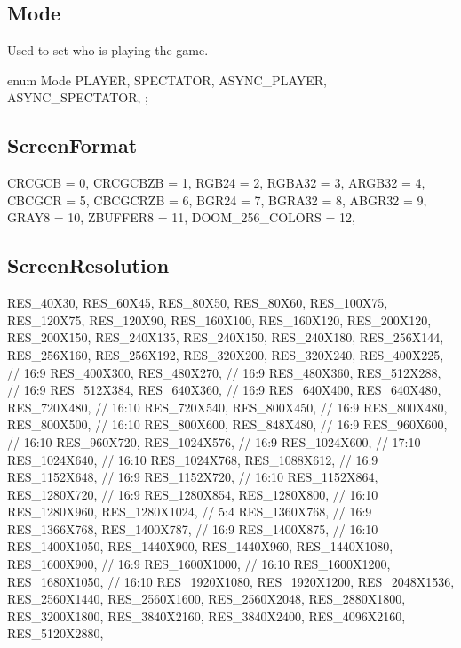 \subsection{Mode}
Used to set who is playing the game.
\begin{clinee}
    enum Mode {
        PLAYER,
        SPECTATOR,
        ASYNC_PLAYER,
        ASYNC_SPECTATOR,
    };
\end{clinee}
\subsection{ScreenFormat}
\begin{clinee}
CRCGCB = 0,
        CRCGCBZB = 1,
        RGB24 = 2,
        RGBA32 = 3,
        ARGB32 = 4,
        CBCGCR = 5,
        CBCGCRZB = 6,
        BGR24 = 7,
        BGRA32 = 8,
        ABGR32 = 9,
        GRAY8 = 10,
        ZBUFFER8 = 11,
        DOOM_256_COLORS = 12,
\end{clinee}
\subsection{ScreenResolution}
\begin{clinee}
RES_40X30,
        RES_60X45,
        RES_80X50,
        RES_80X60,
        RES_100X75,
        RES_120X75,
        RES_120X90,
        RES_160X100,
        RES_160X120,
        RES_200X120,
        RES_200X150,
        RES_240X135,
        RES_240X150,
        RES_240X180,
        RES_256X144,
        RES_256X160,
        RES_256X192,
        RES_320X200,
        RES_320X240,
        RES_400X225,	// 16:9
        RES_400X300,
        RES_480X270,	// 16:9
        RES_480X360,
        RES_512X288,	// 16:9
        RES_512X384,
        RES_640X360,	// 16:9
        RES_640X400,
        RES_640X480,
        RES_720X480,	// 16:10
        RES_720X540,
        RES_800X450,	// 16:9
        RES_800X480,
        RES_800X500,	// 16:10
        RES_800X600,
        RES_848X480,	// 16:9
        RES_960X600,	// 16:10
        RES_960X720,
        RES_1024X576,	// 16:9
        RES_1024X600,	// 17:10
        RES_1024X640,	// 16:10
        RES_1024X768,
        RES_1088X612,	// 16:9
        RES_1152X648,	// 16:9
        RES_1152X720,	// 16:10
        RES_1152X864,
        RES_1280X720,	// 16:9
        RES_1280X854,
        RES_1280X800,	// 16:10
        RES_1280X960,
        RES_1280X1024,	// 5:4
        RES_1360X768,	// 16:9
        RES_1366X768,
        RES_1400X787,	// 16:9
        RES_1400X875,	// 16:10
        RES_1400X1050,
        RES_1440X900,
        RES_1440X960,
        RES_1440X1080,
        RES_1600X900,	// 16:9
        RES_1600X1000,	// 16:10
        RES_1600X1200,
        RES_1680X1050,	// 16:10
        RES_1920X1080,
        RES_1920X1200,
        RES_2048X1536,
        RES_2560X1440,
        RES_2560X1600,
        RES_2560X2048,
        RES_2880X1800,
        RES_3200X1800,
        RES_3840X2160,
        RES_3840X2400,
        RES_4096X2160,
        RES_5120X2880,
\end{clinee}
